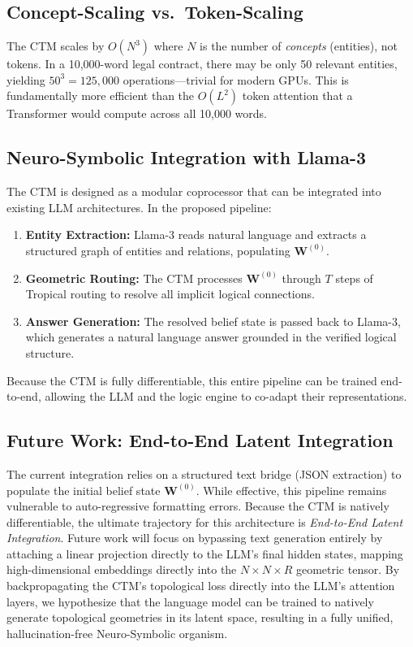 \documentclass[11pt,a4paper]{article}
\begin{document}
\subsection{Concept-Scaling vs.\ Token-Scaling}
The CTM scales by $O(N^3)$ where $N$ is the number of \textit{concepts} (entities), not tokens. In a 10,000-word legal contract, there may be only 50 relevant entities, yielding $50^3 = 125{,}000$ operations—trivial for modern GPUs. This is fundamentally more efficient than the $O(L^2)$ token attention that a Transformer would compute across all 10,000 words.

\subsection{Neuro-Symbolic Integration with Llama-3}
The CTM is designed as a modular coprocessor that can be integrated into existing LLM architectures. In the proposed pipeline:
\begin{enumerate}
    \item \textbf{Entity Extraction:} Llama-3 reads natural language and extracts a structured graph of entities and relations, populating $\mathbf{W}^{(0)}$.
    \item \textbf{Geometric Routing:} The CTM processes $\mathbf{W}^{(0)}$ through $T$ steps of Tropical routing to resolve all implicit logical connections.
    \item \textbf{Answer Generation:} The resolved belief state is passed back to Llama-3, which generates a natural language answer grounded in the verified logical structure.
\end{enumerate}
Because the CTM is fully differentiable, this entire pipeline can be trained end-to-end, allowing the LLM and the logic engine to co-adapt their representations.

\subsection{Future Work: End-to-End Latent Integration}
The current integration relies on a structured text bridge (JSON extraction) to populate the initial belief state $\mathbf{W}^{(0)}$. While effective, this pipeline remains vulnerable to auto-regressive formatting errors. Because the CTM is natively differentiable, the ultimate trajectory for this architecture is \textit{End-to-End Latent Integration}. Future work will focus on bypassing text generation entirely by attaching a linear projection directly to the LLM's final hidden states, mapping high-dimensional embeddings directly into the $N \times N \times R$ geometric tensor. By backpropagating the CTM's topological loss directly into the LLM's attention layers, we hypothesize that the language model can be trained to natively generate topological geometries in its latent space, resulting in a fully unified, hallucination-free Neuro-Symbolic organism.
\end{document}
